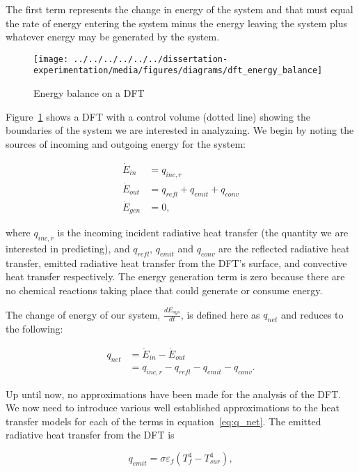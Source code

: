 \documentclass[article]{proc}
\begin{document}
    \noindent The first term represents the change in energy of the system and that must equal the rate of energy entering the system minus the energy leaving the system plus whatever energy may be generated by the system. 

    \begin{figure}[h!]
        \centering
        \texttt{[image: ../../../../../../dissertation-experimentation/media/figures/diagrams/dft\_energy\_balance]}
        \caption{Energy balance on a DFT}
        \label{fig:dft_energy}
    \end{figure}

    Figure~\ref{fig:dft_energy} shows a DFT with a control volume (dotted line) showing the boundaries of the system we are interested in analyzaing. We begin by noting the sources of incoming and outgoing energy for the system:

    \begin{align}\label{eq:dft_balance}
        \dot{E}_{in} &= q_{inc,r} \\
        \dot{E}_{out} &= q_{refl} + q_{emit} + q_{conv} \\
        \dot{E}_{gen} & = 0,
    \end{align}

    \noindent where $q_{inc,r}$ is the incoming incident radiative heat transfer (the quantity we are interested in predicting), and $q_{refl}$, $q_{emit}$ and $q_{conv}$ are the reflected radiative heat transfer, emitted radiative heat transfer from the DFT's surface, and convective heat transfer respectively. The energy generation term is zero because there are no chemical reactions taking place that could generate or consume energy.

    The change of energy of our system, $\frac{dE_{sys}}{dt}$, is defined here as $q_{net}$ and reduces to the following:

    \begin{align}\label{eq:q_net}
        q_{net} &= \dot{E}_{in} - \dot{E}_{out} \\
            &= q_{inc,r} - q_{refl} - q_{emit} - q_{conv}.
    \end{align}

    Up until now, no approximations have been made for the analysis of the DFT. We now need to introduce various well established approximations to the heat transfer models for each of the terms in equation~\ref{eq:q_net}. The emitted radiative heat transfer from the DFT is

    \begin{equation}\label{eq:q_emit}
        q_{emit} = \sigma \varepsilon_f (T_f^4 - T_{sur}^4),
    \end{equation}
\end{document}
